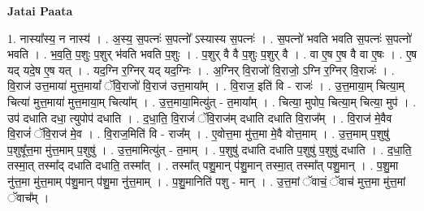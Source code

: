 \documentclass[17pt]{extarticle}
\begin{document}
\textbf{Jatai Paata} \newline

1. नास्या᳚स्य॒ न नास्य॑ । . अ॒स्य॒ स॒पत्नः॑ स॒पत्नो᳚ ऽस्यास्य स॒पत्नः॑ । . स॒पत्नो॑ भवति भवति स॒पत्नः॑ स॒पत्नो॑ भवति । . भ॒व॒ति॒ प॒शुः प॒शुर् भ॑वति भवति प॒शुः । . प॒शुर् वै वै प॒शुः प॒शुर् वै । . वा ए॒ष ए॒ष वै वा ए॒षः । . ए॒ष यद् यदे॒ष ए॒ष यत् । . यद॒ग्नि र॒ग्निर् यद् यद॒ग्निः । . अ॒ग्निर् वि॒राजो॑ वि॒राजो॒ ऽग्नि र॒ग्निर् वि॒राजः॑ । . वि॒राज॑ उत्त॒माया॑ मुत्त॒मायां᳚ ॅवि॒राजो॑ वि॒राज॑ उत्त॒माया᳚म् । . वि॒राज॒ इति॑ वि - राजः॑ । . उ॒त्त॒माया॒म् चित्या॒म् चित्या॑ मुत्त॒माया॑ मुत्त॒माया॒म् चित्या᳚म् । . उ॒त्त॒माया॒मित्यु॑त् - त॒माया᳚म् । . चित्या॒ मुपोप॒ चित्या॒म् चित्या॒ मुप॑ । . उप॑ दधाति दधा॒ त्युपोप॑ दधाति । . द॒धा॒ति॒ वि॒राजं॑ ॅवि॒राज॑म् दधाति दधाति वि॒राज᳚म् । . वि॒राज॑ मे॒वैव वि॒राजं॑ ॅवि॒राज॑ मे॒व । . वि॒राज॒मिति॑ वि - राज᳚म् । . ए॒वोत्त॒मा मु॑त्त॒मा मे॒वै वोत्त॒माम् । . उ॒त्त॒माम् प॒शुषु॑ प॒शुषू᳚त्त॒मा मु॑त्त॒माम् प॒शुषु॑ । . उ॒त्त॒मामित्यु॑त् - त॒माम् । . प॒शुषु॑ दधाति दधाति प॒शुषु॑ प॒शुषु॑ दधाति । . द॒धा॒ति॒ तस्मा॒त् तस्मा᳚द् दधाति दधाति॒ तस्मा᳚त् । . तस्मा᳚त् पशु॒मान् प॑शु॒मान् तस्मा॒त् तस्मा᳚त् पशु॒मान् । . प॒शु॒मा नु॑त्त॒मा मु॑त्त॒माम् प॑शु॒मान् प॑शु॒मा नु॑त्त॒माम् । . प॒शु॒मानिति॑ पशु - मान् । . उ॒त्त॒मां ॅवाचं॒ ॅवाच॑ मुत्त॒मा मु॑त्त॒मां ॅवाच᳚म् । \newline
\end{document}
